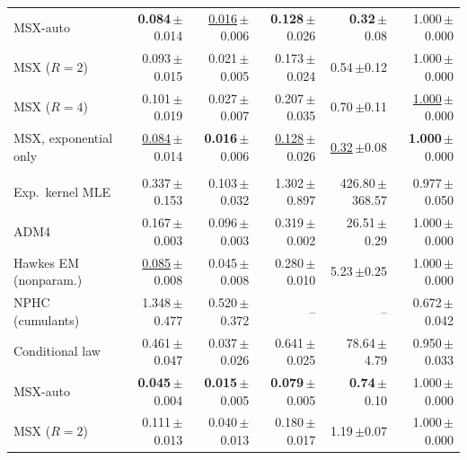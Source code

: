 \begin{tabular}{lrrrrr}
\rowcolor{oursbg} \quad MSX-auto & \textbf{0.084}{\scriptsize\,$\pm$0.014} & \underline{0.016}{\scriptsize\,$\pm$0.006} & \textbf{0.128}{\scriptsize\,$\pm$0.026} & \textbf{0.32}{\scriptsize\,$\pm$0.08} & 1.000{\scriptsize\,$\pm$0.000} \\
\rowcolor{oursbg} \quad MSX ($R=2$) & 0.093{\scriptsize\,$\pm$0.015} & 0.021{\scriptsize\,$\pm$0.005} & 0.173{\scriptsize\,$\pm$0.024} & 0.54{\scriptsize\,$\pm$0.12} & 1.000{\scriptsize\,$\pm$0.000} \\
\rowcolor{oursbg} \quad MSX ($R=4$) & 0.101{\scriptsize\,$\pm$0.019} & 0.027{\scriptsize\,$\pm$0.007} & 0.207{\scriptsize\,$\pm$0.035} & 0.70{\scriptsize\,$\pm$0.11} & \underline{1.000}{\scriptsize\,$\pm$0.000} \\
\rowcolor{oursbg} \quad MSX, exponential only & \underline{0.084}{\scriptsize\,$\pm$0.014} & \textbf{0.016}{\scriptsize\,$\pm$0.006} & \underline{0.128}{\scriptsize\,$\pm$0.026} & \underline{0.32}{\scriptsize\,$\pm$0.08} & \textbf{1.000}{\scriptsize\,$\pm$0.000} \\
\addlinespace[3pt]\multicolumn{6}{l}{\textit{S5: 10-dim.\ power-law network}} \\[1pt]
\quad Exp.\ kernel MLE & 0.337{\scriptsize\,$\pm$0.153} & 0.103{\scriptsize\,$\pm$0.032} & 1.302{\scriptsize\,$\pm$0.897} & 426.80{\scriptsize\,$\pm$368.57} & 0.977{\scriptsize\,$\pm$0.050} \\
\quad ADM4 & 0.167{\scriptsize\,$\pm$0.003} & 0.096{\scriptsize\,$\pm$0.003} & 0.319{\scriptsize\,$\pm$0.002} & 26.51{\scriptsize\,$\pm$0.29} & 1.000{\scriptsize\,$\pm$0.000} \\
\quad Hawkes EM (nonparam.) & \underline{0.085}{\scriptsize\,$\pm$0.008} & 0.045{\scriptsize\,$\pm$0.008} & 0.280{\scriptsize\,$\pm$0.010} & 5.23{\scriptsize\,$\pm$0.25} & 1.000{\scriptsize\,$\pm$0.000} \\
\quad NPHC (cumulants) & 1.348{\scriptsize\,$\pm$0.477} & 0.520{\scriptsize\,$\pm$0.372} & -- & -- & 0.672{\scriptsize\,$\pm$0.042} \\
\quad Conditional law & 0.461{\scriptsize\,$\pm$0.047} & 0.037{\scriptsize\,$\pm$0.026} & 0.641{\scriptsize\,$\pm$0.025} & 78.64{\scriptsize\,$\pm$4.79} & 0.950{\scriptsize\,$\pm$0.033} \\
\rowcolor{oursbg} \quad MSX-auto & \textbf{0.045}{\scriptsize\,$\pm$0.004} & \textbf{0.015}{\scriptsize\,$\pm$0.005} & \textbf{0.079}{\scriptsize\,$\pm$0.005} & \textbf{0.74}{\scriptsize\,$\pm$0.10} & 1.000{\scriptsize\,$\pm$0.000} \\
\rowcolor{oursbg} \quad MSX ($R=2$) & 0.111{\scriptsize\,$\pm$0.013} & 0.040{\scriptsize\,$\pm$0.013} & 0.180{\scriptsize\,$\pm$0.017} & 1.19{\scriptsize\,$\pm$0.07} & 1.000{\scriptsize\,$\pm$0.000} \\

\end{tabular}
